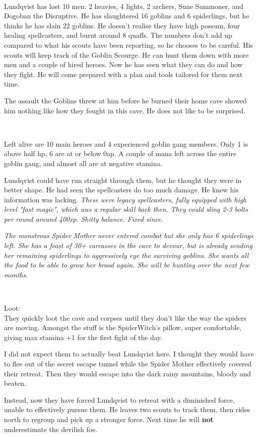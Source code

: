 \

Lundqvist has lost 10 men: 2 heavies, 4 lights, 2 archers, Sune Summoner, and Dogoban the Disruptive. He has slaughtered 16 goblins and 6 spiderlings, but he thinks he has slain 22 goblins. He doesn't realise they have high possum, four healing spellcasters, and burnt around 8 quaffs. The numbers don't add up compared to what his scouts have been reporting, so he chooses to be careful. His scouts will keep track of the Goblin Scourge. He can hunt them down with more men and a couple of hired heroes. Now he has seen what they can do and how they fight. He will come prepared with a plan and tools tailored for them next time.

The assault the Goblins threw at him before he burned their home cave showed him nothing like how they fought in this cave. He does not like to be surprised.

\

Left alive are 10 main heroes and 4 experienced goblin gang members. Only 1 is above half hp, 6 are at or below 0ap. A couple of mana left across the entire goblin gang, and almost all are at negative stamina.

Lundqvist could have run straight through them, but he thought they were in better shape. He had seen the spellcasters do too much damage. He knew his information was lacking. \textit{These were legacy spellcasters, fully equipped with high level "fast magic", which was a regular skill back then. They could sling 2-3 bolts per round around 400xp. Shitty balance. Fixed since.}

\textit{The monstrous Spider Mother never entered combat but she only has 6 spiderlings left. She has a feast of 30+ carcasses in the cave to devour, but is already sending her remaining spiderlings to aggressively eye the surviving goblins. She wants all the food to be able to grow her brood again. She will be hunting over the next few months.}

\

Loot:\\
They quickly loot the cave and corpses until they don't like the way the spiders are moving. Amongst the stuff is the SpiderWitch's pillow, super comfortable, giving max stamina +1 for the first fight of the day.


\begin{readoutloud}
I did not expect them to actually beat Lundqvist here. I thought they would have to flee out of the secret escape tunnel while the Spider Mother effectively covered their retreat. Then they would escape into the dark rainy mountains, bloody and beaten.

Instead, now they have forced Lundqvist to retreat with a diminished force, unable to effectively pursue them. He leaves two scouts to track them, then rides north to regroup and pick up a stronger force. Next time he will \textbf{not} underestimate the devilish foe.
\end{readoutloud}


